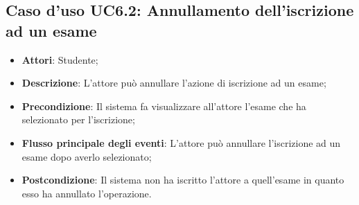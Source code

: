 \subsection{Caso d'uso \texorpdfstring{UC6.2}{UC6.2}: Annullamento dell'iscrizione ad un esame}
\begin{itemize}
	\item \textbf{Attori}: Studente;
	\item \textbf{Descrizione}: L'attore può annullare l'azione di iscrizione ad un esame;
	\item \textbf{Precondizione}: Il sistema fa visualizzare all'attore l'esame che ha selezionato per l'iscrizione;
	
	\item \textbf{Flusso principale degli eventi}: L'attore può annullare l'iscrizione ad un esame dopo averlo selezionato;
	\item \textbf{Postcondizione}: Il sistema non ha iscritto l'attore a quell'esame in quanto esso ha annullato l'operazione.
	
\end{itemize}
